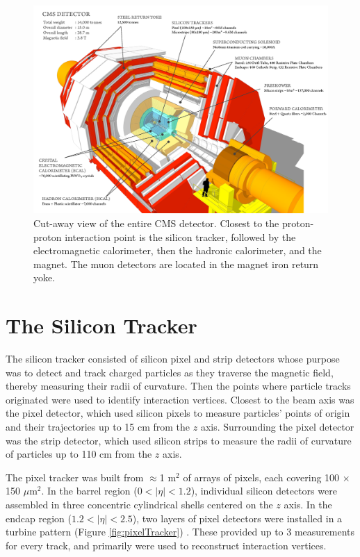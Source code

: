 \begin{figure}[h]
	\centering
	\includegraphics[width=1\textwidth]{figures/cmsDetectorBasic.png}
	\caption{Cut-away view of the entire CMS detector.  Closest to the proton-proton interaction point is the 
		silicon tracker, followed by the electromagnetic calorimeter, then the hadronic calorimeter, and the 
	magnet.  The muon detectors are located in the magnet iron return yoke.}
	\label{fig:layersOfCMS}
\end{figure}

\section{The Silicon Tracker}
\label{sec:siTrackerDescription}
The silicon tracker consisted of silicon pixel and strip detectors whose purpose was to detect and track charged particles 
as they traverse the magnetic field, thereby measuring their radii of curvature.  Then the points where particle tracks 
originated were used to identify interaction vertices.  Closest to the beam axis was the pixel detector, which used 
silicon pixels to measure particles' points of origin and their trajectories up to 15 cm from the $z$ axis.  Surrounding 
the pixel detector was the strip detector, which used silicon strips to measure the radii of curvature of particles up to 
110 cm from the $z$ axis.


The pixel tracker was built from $\approx$1 m$^{2}$ of arrays of pixels, each covering 100 $\times$ 150 $\mu$m$^{2}$.  In 
the barrel region ($0 < |\eta| < 1.2$), individual silicon detectors were assembled in three concentric cylindrical shells 
centered on the $z$ axis.  In the endcap region ($1.2 < |\eta| < 2.5$), two layers of pixel detectors were installed in a 
turbine pattern (Figure \ref{fig:pixelTracker}) \cite{pixelCommissioning}.  These provided up to 3 measurements for every 
track, and primarily were used to reconstruct interaction vertices.

